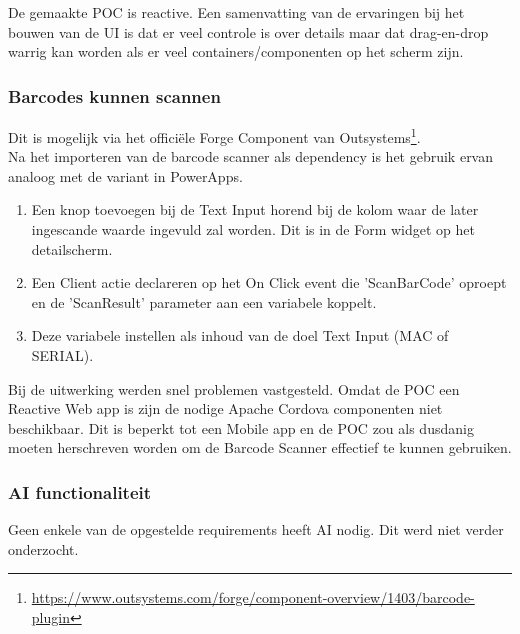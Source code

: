 De gemaakte POC is reactive. Een samenvatting van de ervaringen bij het bouwen van de UI is dat er veel controle is over details maar dat drag-en-drop warrig kan worden als er veel containers/componenten op het scherm zijn.

\subsubsection{Barcodes kunnen scannen}
\label{subsec:os-barcode}

Dit is mogelijk via het officiële Forge Component van Outsystems\footnote{\url{https://www.outsystems.com/forge/component-overview/1403/barcode-plugin}}.\\
Na het importeren van de barcode scanner als dependency is het gebruik ervan analoog met de variant in PowerApps.
\begin{enumerate}
    \item Een knop toevoegen bij de Text Input horend bij de kolom waar de later ingescande waarde ingevuld zal worden. Dit is in de Form widget op het detailscherm.
    \item Een Client actie declareren op het On Click event die 'ScanBarCode' oproept en de 'ScanResult' parameter aan een variabele koppelt.
    \item Deze variabele instellen als inhoud van de doel Text Input (MAC of SERIAL).
\end{enumerate}

Bij de uitwerking werden snel problemen vastgesteld. Omdat de POC een Reactive Web app is zijn de nodige Apache Cordova componenten niet beschikbaar. Dit is beperkt tot een Mobile app en de POC zou als dusdanig moeten herschreven worden om de Barcode Scanner effectief te kunnen gebruiken.

\subsubsection{AI functionaliteit}

Geen enkele van de opgestelde requirements heeft AI nodig. Dit werd niet verder onderzocht.


